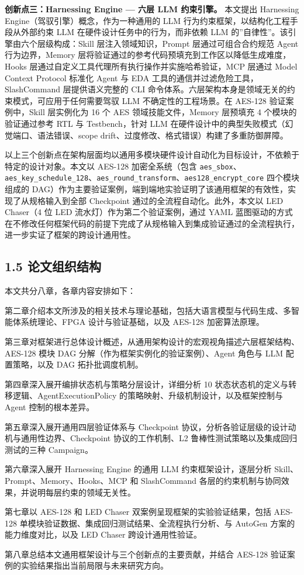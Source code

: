 \textbf{创新点三：Harnessing Engine --- 六层 LLM 约束引擎。} 本文提出
Harnessing Engine（驾驭引擎）概念，作为一种通用的 LLM
行为约束框架，以结构化工程手段从外部约束 LLM
在硬件设计任务中的行为，而非依赖 LLM
的''自律性''。该引擎由六个层级构成：Skill 层注入领域知识，Prompt
层通过可组合合约规范 Agent 行为边界，Memory
层将验证通过的参考代码预填充到工作区以降低生成难度，Hooks
层通过自定义工具代理所有执行操作并实施哈希验证，MCP 层通过 Model Context
Protocol 标准化 Agent 与 EDA 工具的通信并过滤危险工具，SlashCommand
层提供语义完整的 CLI
命令体系。六层架构本身是领域无关的约束模式，可应用于任何需要驾驭 LLM
不确定性的工程场景。在 AES-128 验证案例中，Skill 层实例化为 16 个 AES
领域技能文件，Memory 层预填充 4 个模块的验证通过参考 RTL 与
Testbench，针对 LLM
在硬件设计中的典型失败模式（幻觉端口、语法错误、scope
drift、过度修改、格式错误）构建了多重防御屏障。

以上三个创新点在架构层面均以通用多模块硬件设计自动化为目标设计，不依赖于特定的设计对象。本文以
AES-128 加密全系统（包含
\texttt{aes\_sbox}、\texttt{aes\_key\_schedule\_128}、\texttt{aes\_round\_transform}、\texttt{aes128\_encrypt\_core}
四个模块组成的
DAG）作为主要验证案例，端到端地实验证明了该通用框架的有效性，实现了从规格输入到全部
Checkpoint 通过的全流程自动化。此外，本文以 LED Chaser（4 位 LED
流水灯）作为第二个验证案例，通过 YAML
蓝图驱动的方式在不修改任何框架代码的前提下完成了从规格输入到集成验证通过的全流程执行，进一步实证了框架的跨设计通用性。

\subsection{1.5
论文组织结构}\label{ux8bbaux6587ux7ec4ux7ec7ux7ed3ux6784}

本文共分八章，各章内容安排如下：

第二章介绍本文所涉及的相关技术与理论基础，包括大语言模型与代码生成、多智能体系统理论、FPGA
设计与验证基础，以及 AES-128 加密算法原理。

第三章对框架进行总体设计概述，从通用架构设计的宏观视角描述六层框架结构、AES-128
模块 DAG 分解（作为框架实例化的验证案例）、Agent 角色与 LLM
配置策略，以及 DAG 拓扑批调度机制。

第四章深入展开编排状态机与策略分层设计，详细分析 10
状态状态机的定义与转移逻辑、AgentExecutionPolicy
的策略映射、升级机制设计，以及框架控制与 Agent 控制的根本差异。

第五章深入展开通用四层验证体系与 Checkpoint
协议，分析各验证层级的设计动机与通用性边界、Checkpoint
协议的工作机制、L2 鲁棒性测试策略以及集成回归测试的三种 Campaign。

第六章深入展开 Harnessing Engine 的通用 LLM 约束框架设计，逐层分析
Skill、Prompt、Memory、Hooks、MCP 和 SlashCommand
各层的约束机制与协同效果，并说明每层约束的领域无关性。

第七章以 AES-128 和 LED Chaser 双案例呈现框架的实验验证结果，包括
AES-128 单模块验证数据、集成回归测试结果、全流程执行分析、与 AutoGen
方案的能力维度对比，以及 LED Chaser 跨设计通用性验证。

第八章总结本文通用框架设计与三个创新点的主要贡献，并结合 AES-128
验证案例的实验结果指出当前局限与未来研究方向。
